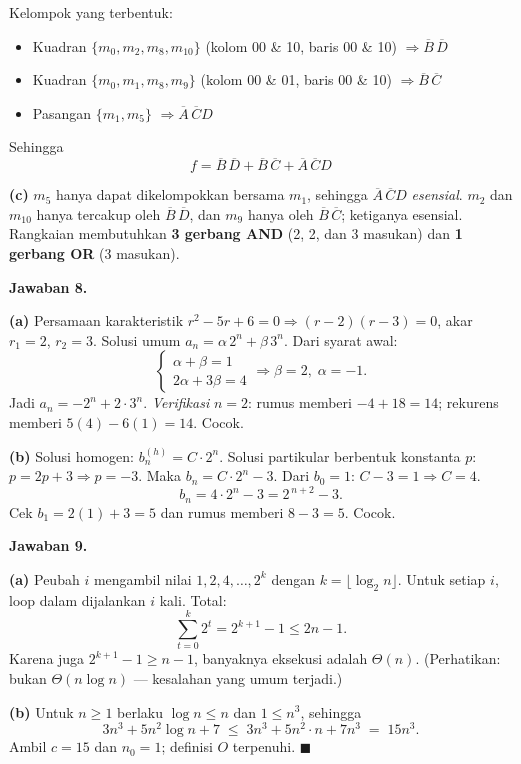 \documentclass[11pt,a4paper]{article}
\newcommand{\jawab}[1]{\vspace{4pt}\noindent\textbf{Jawaban #1.}\par\nobreak\vspace{2pt}}
\newcommand{\Comp}[1]{\overline{#1}}
\begin{document}
Kelompok yang terbentuk:
\begin{itemize}[leftmargin=*,nosep]
  \item Kuadran $\{m_0,m_2,m_8,m_{10}\}$ (kolom 00 \& 10, baris 00 \& 10) $\Rightarrow \Comp{B}\,\Comp{D}$
  \item Kuadran $\{m_0,m_1,m_8,m_9\}$ (kolom 00 \& 01, baris 00 \& 10) $\Rightarrow \Comp{B}\,\Comp{C}$
  \item Pasangan $\{m_1,m_5\}$ $\Rightarrow \Comp{A}\,\Comp{C}D$
\end{itemize}
Sehingga
\[
\boxed{\,f = \Comp{B}\,\Comp{D} + \Comp{B}\,\Comp{C} + \Comp{A}\,\Comp{C}D\,}
\]

\textbf{(c)} $m_5$ hanya dapat dikelompokkan bersama $m_1$, sehingga
$\Comp{A}\,\Comp{C}D$ \emph{esensial}. $m_2$ dan $m_{10}$ hanya tercakup oleh
$\Comp{B}\,\Comp{D}$, dan $m_9$ hanya oleh $\Comp{B}\,\Comp{C}$; ketiganya
esensial. Rangkaian membutuhkan \textbf{3 gerbang AND} (2, 2, dan 3 masukan)
dan \textbf{1 gerbang OR} (3 masukan).

\jawab{8}
\textbf{(a)} Persamaan karakteristik $r^{2} - 5r + 6 = 0 \Rightarrow (r-2)(r-3) = 0$,
akar $r_1 = 2$, $r_2 = 3$. Solusi umum $a_n = \alpha\,2^{n} + \beta\,3^{n}$.
Dari syarat awal:
\[
\begin{cases}
\alpha + \beta = 1\\
2\alpha + 3\beta = 4
\end{cases}
\Longrightarrow \beta = 2,\; \alpha = -1 .
\]
Jadi $a_n = -2^{n} + 2 \cdot 3^{n}$.
\emph{Verifikasi} $n = 2$: rumus memberi $-4 + 18 = 14$; rekurens memberi
$5(4) - 6(1) = 14$. Cocok.

\textbf{(b)} Solusi homogen: $b_n^{(h)} = C \cdot 2^{n}$.
Solusi partikular berbentuk konstanta $p$: $p = 2p + 3 \Rightarrow p = -3$.
Maka $b_n = C \cdot 2^{n} - 3$. Dari $b_0 = 1$: $C - 3 = 1 \Rightarrow C = 4$.
\[
b_n = 4 \cdot 2^{n} - 3 = 2^{\,n+2} - 3 .
\]
Cek $b_1 = 2(1) + 3 = 5$ dan rumus memberi $8 - 3 = 5$. Cocok.

\jawab{9}
\textbf{(a)} Peubah $i$ mengambil nilai $1, 2, 4, \dots, 2^{k}$ dengan
$k = \lfloor \log_2 n \rfloor$. Untuk setiap $i$, loop dalam dijalankan $i$ kali.
Total:
\[
\sum_{t=0}^{k} 2^{t} = 2^{k+1} - 1 \le 2n - 1 .
\]
Karena juga $2^{k+1} - 1 \ge n - 1$, banyaknya eksekusi adalah $\Theta(n)$.
(Perhatikan: bukan $\Theta(n \log n)$ --- kesalahan yang umum terjadi.)

\textbf{(b)} Untuk $n \ge 1$ berlaku $\log n \le n$ dan $1 \le n^{3}$, sehingga
\[
3n^{3} + 5n^{2}\log n + 7 \;\le\; 3n^{3} + 5n^{2}\cdot n + 7n^{3} \;=\; 15n^{3}.
\]
Ambil $c = 15$ dan $n_0 = 1$; definisi $O$ terpenuhi. $\blacksquare$
\end{document}
